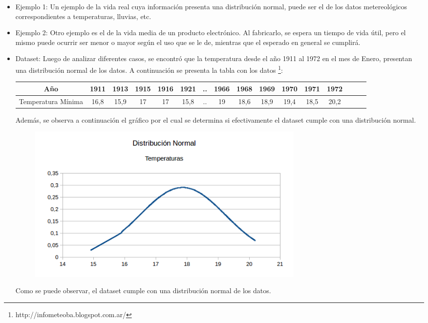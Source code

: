 \documentclass[10pt, a4paper,english,spanish,hidelinks]{article}
\begin{document}
\begin{itemize}
\item Ejemplo 1: Un ejemplo de la vida real cuya información presenta una distribución normal, puede ser el de los datos metereológicos correspondientes a temperaturas, lluvias, etc. 

\item Ejemplo 2: Otro ejemplo es el de la vida media de un producto electrónico. Al fabricarlo, se espera un tiempo de vida útil, pero el mismo puede ocurrir ser menor o mayor según el uso que se le de, mientras que el esperado en general se cumplirá. 

\item Dataset: Luego de analizar diferentes casos, se encontró que la temperatura desde el año 1911 al 1972 en el mes de Enero, presentan una distribución normal de los datos. A continuación se presenta la tabla con los datos \footnote{http://infometeoba.blogspot.com.ar/}:

\begin{table}[htdp]
  \begin{center}
    \begin{tabular}{|c|c|c|c|c|c|c|c|c|c|c|c|c|c|c|c|} \hline
       Año  & 1911 & 1913 & 1915 & 1916 & 1921 & .. & 1966& 1968& 1969& 1970& 1971& 1972 \\ \hline
       Temperatura Mínima & 16,8 & 15,9 & 17 & 17 & 15,8 & .. & 19 & 18,6 & 18,9 & 19,4 & 18,5 & 20,2 \\ \hline
    \end{tabular}
  \end{center}
\end{table} 

Además, se observa a continuación el gráfico por el cual se determina si efectivamente el dataset cumple con una distribución normal.

\begin{figure}[h!]
  \centering
  \includegraphics[width=0.7\textwidth]{./imagenes/DatasetNormal.png}
  \caption{}
\end{figure}

Como se puede observar, el dataset cumple con una distribución normal de los datos. 


\end{itemize}
\end{document}
